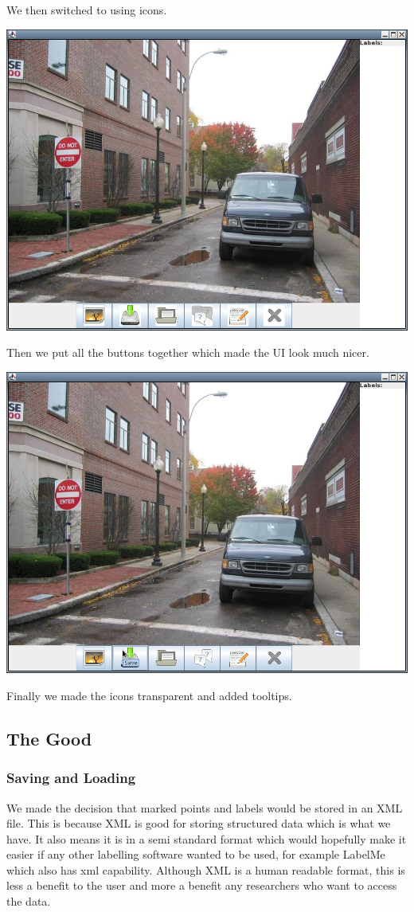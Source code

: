 \documentclass[a4paper,11pt,oneside]{article}
\begin{document}
We then switched to using icons.

\includegraphics[width=\textwidth]{old10.png}

Then we put all the buttons together which made the UI look much nicer.

\includegraphics[width=\textwidth]{old11.png}

Finally we made the icons transparent and added tooltips.

\subsection{The Good}

\subsubsection{Saving and Loading}
We made the decision that marked points and labels would be stored in an XML
file.  This is because XML is good for storing structured data which is what we
have.  It also means it is in a semi standard format which would hopefully make
it easier if any other labelling software wanted to be used, for example LabelMe
which also has xml capability.  Although XML is a human readable format, this is
less a benefit to the user and more a benefit any researchers who want to access
the data.
\end{document}
